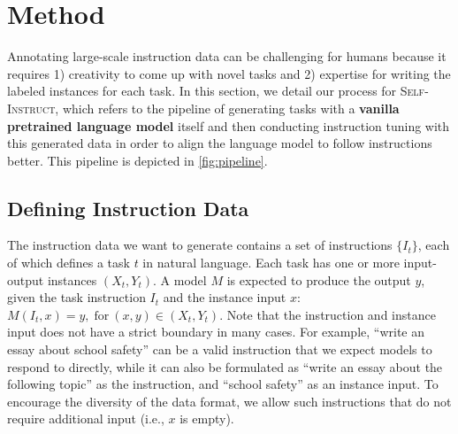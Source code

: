 \documentclass[11pt]{article}
\newcommand{\yizhong}[1]{\textcolor{violet}{[YZ: #1]}}
\newcommand{\name}{\textsc{Self-Instruct}}
\begin{document}
\section{Method}
\label{sec:method}

Annotating large-scale instruction data can be challenging for humans because it requires 1) creativity to come up with novel tasks and 2) expertise for writing the labeled instances for each task.
In this section, we detail our process for \name, which refers to the pipeline of generating tasks with a \textbf{vanilla pretrained language model} itself and then conducting instruction tuning with this generated data in order to align the language model to follow instructions better. This pipeline is depicted in \autoref{fig:pipeline}. 

\subsection{Defining Instruction Data}
\label{subsec:instruction-data-definition}

The instruction data we want to generate contains a set of instructions $\{I_t\}$, each of which defines a task $t$ in natural language. Each task has one or more input-output instances $(X_t, Y_t)$.
A model $M$ is expected to produce the output $y$, given the task instruction $I_t$ and the instance input $x$: $M(I_t, x) = y, \;  \mbox{for} \ (x,y)\in (X_t, Y_t)$.
Note that the instruction and instance input does not have a strict boundary in many cases. For example, ``write an essay about school safety'' can be a valid instruction that we expect models to respond to directly, while it can also be formulated as ``write an essay about the following topic'' as the instruction, and ``school safety'' as an instance input. To encourage the diversity of the data format, we allow such instructions that do not require additional input (i.e., $x$ is empty).
\end{document}
